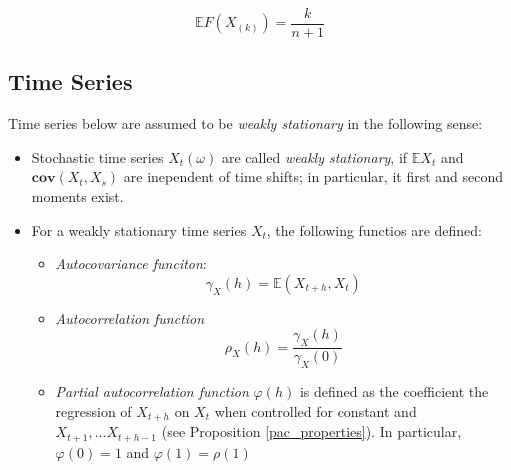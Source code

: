 \documentclass[12pt]{article}
\theoremstyle{definition}
\theoremstyle{remark}
\numberwithin{equation}{section}
\newcommand{\EE}{\mathbb{E}}
\begin{document}
\begin{equation}\label{kth_order_expectation}
	\mathbb{E}F(X_{(k)}) = \frac k{n+1}
\end{equation}

\subsection{Time Series}

Time series below are assumed to be \emph{weakly stationary} in the following sense:

\begin{itemize}
	\item Stochastic time series $X_t(\omega)$ are called \emph{weakly stationary}, if $\EE X_t$ and $\textbf{cov}(X_t, X_s)$ are inependent of time shifts; in particular, it first and second moments exist.
	\item For a weakly stationary time series $X_t$, the following functios are defined:
	\begin{itemize}
		\item\emph{Autocovariance funciton}:
		\begin{equation}
			\gamma_X(h) = \EE(X_{t+h}, X_t)
		\end{equation}
		\item \emph{Autocorrelation function}
		\begin{equation}
			\rho_X(h) = \frac {\gamma_X(h)}{\gamma_X(0)}
		\end{equation}
		\item \emph{Partial autocorrelation function} $\varphi(h)$ is defined as the coefficient the regression of $X_{t+h}$ on $X_t$ when controlled for constant and $X_{t+1}, \ldots X_{t+h-1}$ (see Proposition \ref{pac_properties}). In particular, $\varphi(0) = 1$ and $\varphi(1) = \rho(1)$
	\end{itemize}

\end{itemize}
\end{document}
